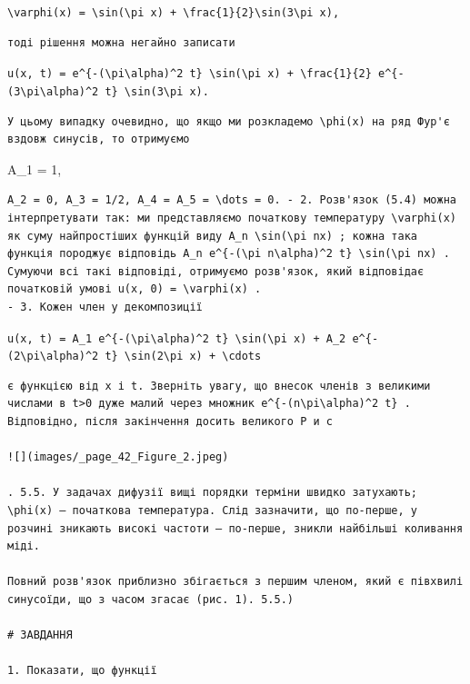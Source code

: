 \documentclass[
  ukrainian,
]{article}
\begin{document}
\texttt{\textbackslash{}varphi(x)\ =\ \textbackslash{}sin(\textbackslash{}pi\ x)\ +\ \textbackslash{}frac\{1\}\{2\}\textbackslash{}sin(3\textbackslash{}pi\ x),}

\begin{verbatim}
тоді рішення можна негайно записати
\end{verbatim}

\texttt{u(x,\ t)\ =\ e\^{}\{-(\textbackslash{}pi\textbackslash{}alpha)\^{}2\ t\}\ \textbackslash{}sin(\textbackslash{}pi\ x)\ +\ \textbackslash{}frac\{1\}\{2\}\ e\^{}\{-(3\textbackslash{}pi\textbackslash{}alpha)\^{}2\ t\}\ \textbackslash{}sin(3\textbackslash{}pi\ x).}

\begin{verbatim}
У цьому випадку очевидно, що якщо ми розкладемо \phi(x) на ряд Фур'є вздовж синусів, то отримуємо
\end{verbatim}

A\_1 = 1,

\begin{verbatim}
A_2 = 0, A_3 = 1/2, A_4 = A_5 = \dots = 0. - 2. Розв'язок (5.4) можна інтерпретувати так: ми представляємо початкову температуру \varphi(x) як суму найпростіших функцій виду A_n \sin(\pi nx) ; кожна така функція породжує відповідь A_n e^{-(\pi n\alpha)^2 t} \sin(\pi nx) . Сумуючи всі такі відповіді, отримуємо розв'язок, який відповідає початковій умові u(x, 0) = \varphi(x) .
- 3. Кожен член у декомпозиції
\end{verbatim}

\texttt{u(x,\ t)\ =\ A\_1\ e\^{}\{-(\textbackslash{}pi\textbackslash{}alpha)\^{}2\ t\}\ \textbackslash{}sin(\textbackslash{}pi\ x)\ +\ A\_2\ e\^{}\{-(2\textbackslash{}pi\textbackslash{}alpha)\^{}2\ t\}\ \textbackslash{}sin(2\textbackslash{}pi\ x)\ +\ \textbackslash{}cdots}

\begin{verbatim}
є функцією від x і t. Зверніть увагу, що внесок членів з великими числами в t>0 дуже малий через множник e^{-(n\pi\alpha)^2 t} . Відповідно, після закінчення досить великого Р и с

![](images/_page_42_Figure_2.jpeg)

. 5.5. У задачах дифузії вищі порядки терміни швидко затухають; \phi(x) — початкова температура. Слід зазначити, що по-перше, у розчині зникають високі частоти — по-перше, зникли найбільші коливання міді.

Повний розв'язок приблизно збігається з першим членом, який є півхвилі синусоїди, що з часом згасає (рис. 1). 5.5.)

# ЗАВДАННЯ

1. Показати, що функції
\end{verbatim}
\end{document}
